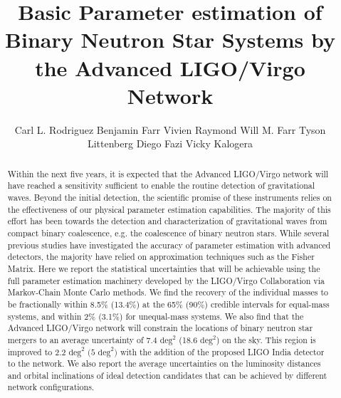\documentclass[11pt,a4paper]{emulateapj} 
\newcommand{\will}[1]{{\color{cyan} #1}}
\begin{document}
\title{Basic Parameter estimation of Binary Neutron Star Systems by
  the Advanced LIGO/Virgo Network} \author{Carl L. Rodriguez
Benjamin Farr 
Vivien Raymond  Will M. Farr 
Tyson Littenberg
Diego Fazi
Vicky Kalogera}

 



\begin{abstract}

Within the next five years, it is expected that the Advanced LIGO/Virgo network will have
reached a sensitivity sufficient to enable the routine detection of
gravitational waves.  Beyond the initial detection, the scientific
promise of these instruments relies on the effectiveness of our physical
parameter estimation capabilities. The majority of this effort has been towards the
detection and characterization of gravitational waves from compact
binary coalescence, e.g. the coalescence of binary neutron stars.
While several previous studies have investigated the accuracy of parameter
estimation with advanced detectors, the majority have relied
on approximation techniques such as the Fisher Matrix.  Here we report the
statistical uncertainties that will be achievable using
the full parameter estimation machinery developed by the LIGO/Virgo
Collaboration via Markov-Chain Monte Carlo methods. 
 We find the recovery of the individual masses to be
fractionally within 8.5\% (13.4\%) at the 65\% (90\%) credible intervals for equal-mass
systems, and within 2\% (3.1\%) for unequal-mass systems.  We also find that the Advanced
LIGO/Virgo network will constrain the locations of binary neutron star mergers to an average
 uncertainty of $7.4$ $\mathrm{deg}^2$ (18.6 $\mathrm{deg}^2$) on the sky.  This region is improved to  2.2 $\mathrm{deg}^2$ $(5$ $\mathrm{deg}^2)$ with the addition of the proposed LIGO India detector to the network.  We also report the
average uncertainties on the luminosity distances and
orbital inclinations of ideal detection candidates that can be
achieved by different network configurations.
\end{abstract}
\end{document}
